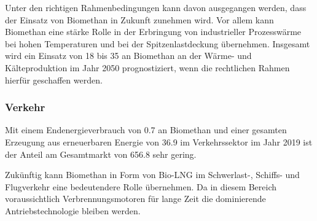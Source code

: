 Unter den richtigen Rahmenbedingungen kann davon ausgegangen werden, dass der Einsatz von Biomethan in Zukunft zunehmen wird. Vor allem kann Biomethan eine stärke Rolle in der Erbringung von industrieller Prozesswärme bei hohen Temperaturen und bei der Spitzenlastdeckung übernehmen. Insgesamt wird ein Einsatz von \SI{18}{\twh} bis \SI{35}{\twh} an Biomethan an der Wärme- und Kälteproduktion im Jahr 2050 prognostiziert, wenn die rechtlichen Rahmen hierfür geschaffen werden. \parencite{dena2017}


\subsubsection{Verkehr}

Mit einem Endenergieverbrauch von \SI{0.7}{\twh} an Biomethan und einer gesamten Erzeugung aus erneuerbaren Energie von \SI{36.9}{\twh} im Verkehrssektor im Jahr 2019 ist der Anteil am Gesamtmarkt von \SI{656.8}{\twh} sehr gering. \parencite{BWE2020} \smallskip

Zukünftig kann Biomethan in Form von Bio-\gls{LNG} im Schwerlast-, Schiffs- und Flugverkehr eine bedeutendere Rolle übernehmen. Da in diesem Bereich voraussichtlich Verbrennungsmotoren für lange Zeit die dominierende Antriebstechnologie bleiben werden. \parencite{dena2017}